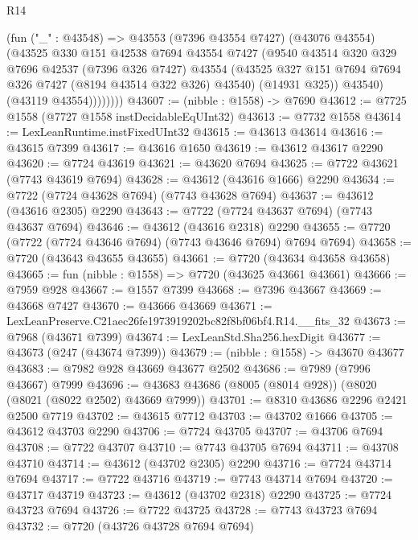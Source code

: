 \begin{lexlean}{R14}
\begin{coremodule}
                (fun ("_" : @43548) =>
                @43553
                  (@7396 @43554 @7427)
                  (@43076 @43554)
                  (@43525
                    @330
                    @151
                    @42538
                    @7694
                    @43554
                    @7427
                    (@9540
                      @43514
                      @320
                      @329
                      @7696
                      @42537
                      (@7396 @326 @7427)
                      @43554
                      (@43525 @327 @151 @7694 @7694 @326 @7427 (@8194 @43514 @322 @326) @43540)
                      (@14931 @325))
                    @43540)
                  (@43119 @43554))))))))
@43607 := (nibble : @1558) -> @7690
@43612 := @7725 @1558 (@7727 @1558 instDecidableEqUInt32)
@43613 := @7732 @1558
@43614 := LexLeanRuntime.instFixedUInt32
@43615 := @43613 @43614
@43616 := @43615 @7399
@43617 := @43616 @1650
@43619 := @43612 @43617 @2290
@43620 := @7724 @43619
@43621 := @43620 @7694
@43625 := @7722 @43621 (@7743 @43619 @7694)
@43628 := @43612 (@43616 @1666) @2290
@43634 := @7722 (@7724 @43628 @7694) (@7743 @43628 @7694)
@43637 := @43612 (@43616 @2305) @2290
@43643 := @7722 (@7724 @43637 @7694) (@7743 @43637 @7694)
@43646 := @43612 (@43616 @2318) @2290
@43655 := @7720 (@7722 (@7724 @43646 @7694) (@7743 @43646 @7694) @7694 @7694)
@43658 := @7720 (@43643 @43655 @43655)
@43661 := @7720 (@43634 @43658 @43658)
@43665 := fun (nibble : @1558) => @7720 (@43625 @43661 @43661)
@43666 := @7959 @928
@43667 := @1557 @7399
@43668 := @7396 @43667
@43669 := @43668 @7427
@43670 := @43666 @43669
@43671 := LexLeanPreserve.C21aec26fe1973919202bc82f8bf06bf4.R14.__fits_32
@43673 := @7968 (@43671 @7399)
@43674 := LexLeanStd.Sha256.hexDigit
@43677 := @43673 (@247 (@43674 @7399))
@43679 := (nibble : @1558) -> @43670 @43677
@43683 := @7982 @928 @43669 @43677 @2502
@43686 := @7989 (@7996 @43667) @7999
@43696 := @43683 @43686 (@8005 (@8014 @928)) (@8020 (@8021 (@8022 @2502) @43669 @7999))
@43701 := @8310 @43686 @2296 @2421 @2500 @7719
@43702 := @43615 @7712
@43703 := @43702 @1666
@43705 := @43612 @43703 @2290
@43706 := @7724 @43705
@43707 := @43706 @7694
@43708 := @7722 @43707
@43710 := @7743 @43705 @7694
@43711 := @43708 @43710
@43714 := @43612 (@43702 @2305) @2290
@43716 := @7724 @43714 @7694
@43717 := @7722 @43716
@43719 := @7743 @43714 @7694
@43720 := @43717 @43719
@43723 := @43612 (@43702 @2318) @2290
@43725 := @7724 @43723 @7694
@43726 := @7722 @43725
@43728 := @7743 @43723 @7694
@43732 := @7720 (@43726 @43728 @7694 @7694)

\end{coremodule}
\end{lexlean}
